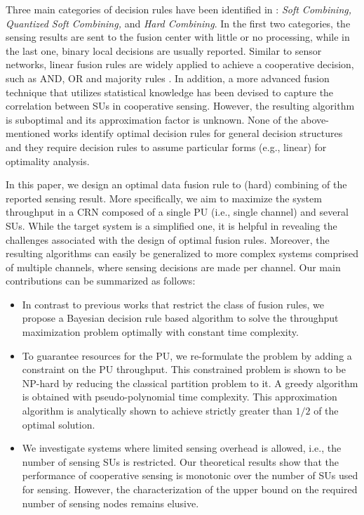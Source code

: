 \documentclass[conference]{IEEEtran}
\begin{document}
Three main categories of decision rules have been identified in \cite{survey}: \emph{Soft Combining, Quantized Soft Combining,} and \emph{Hard
Combining}. In the first two categories, the sensing results are sent
to the fusion center with little or no processing, while in the last
one, binary local decisions are usually reported.  Similar to sensor
networks, linear fusion rules are widely applied to achieve a
cooperative decision, such as AND, OR and majority rules \cite{5169958}. In
addition, a more advanced fusion technique that utilizes statistical
knowledge \cite{4453896} has been devised to capture the correlation between SUs
in cooperative sensing. However, the resulting algorithm is suboptimal
and its approximation factor is unknown. None of the above-mentioned
works identify optimal decision rules for general decision structures
and they require decision rules to assume particular forms (e.g., linear)
for optimality analysis.

In this paper, we design an optimal data fusion rule to (hard)
combining of the reported sensing result. More specifically, we aim to
maximize the system throughput in a CRN composed of a single PU (i.e.,
single channel) and several SUs. While the target system is a
simplified one, it is helpful in revealing the challenges associated
with the design of optimal fusion rules.  Moreover, the resulting
algorithms can easily be generalized to more complex systems comprised
of multiple channels, where sensing decisions are made per
channel. Our main contributions can be summarized as follows:

\begin{itemize}
\item In contrast to previous works that restrict the class of fusion rules, we propose a Bayesian decision rule based algorithm
to solve the throughput maximization problem optimally
with constant time complexity.
 
\item To guarantee resources for the PU, we re-formulate the
problem by adding a constraint on the PU throughput.
This constrained problem is shown to be NP-hard by reducing the
classical partition problem \cite{Garey} to it. A greedy algorithm is
obtained with pseudo-polynomial time complexity. This
approximation algorithm is analytically shown to achieve strictly greater than $1/2$ of the optimal solution.

\item We investigate systems where limited sensing overhead
is allowed, i.e., the number of sensing SUs is
restricted. Our theoretical results show
that the performance of cooperative sensing is monotonic
over the number of SUs used for sensing. However, the characterization
of the upper bound on the required number of sensing nodes remains
elusive.
  
\end{itemize}    
\end{document}
